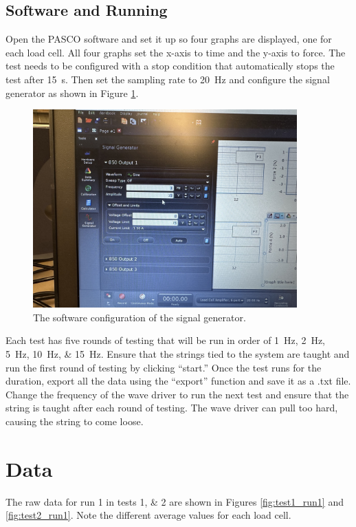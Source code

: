 \documentclass[12 pt]{report}
\begin{document}
\subsection{Software and Running} \label{software}
Open the PASCO software and set it up so four graphs are displayed, one for each load cell. All four graphs set the x-axis to time and the y-axis to force. The test needs to be configured with a stop condition that automatically stops the test after \qty{15}{\second}. Then set the sampling rate to \qty{20}{\hertz} and configure the signal generator as shown in Figure \ref{fig:signal_generator}.

\begin{figure}[htbp]
	\centering
	\includegraphics[width=4in]{images/IMG_1330}
	\caption{The software configuration of the signal generator.}
	\label{fig:signal_generator}
\end{figure}

Each test has five rounds of testing that will be run in order of \qtylist{1;2;5;10;15}{\hertz}. Ensure that the strings tied to the system are taught and run the first round of testing by clicking ``start.'' Once the test runs for the duration, export all the data using the ``export'' function and save it as a .txt file. Change the frequency of the wave driver to run the next test and ensure that the string is taught after each round of testing. The wave driver can pull too hard, causing the string to come loose.

\section{Data} \label{data}
The raw data for run \num{1} in tests \numlist{1;2} are shown in Figures \ref{fig:test1_run1} and \ref{fig:test2_run1}. Note the different average values for each load cell.
\end{document}
